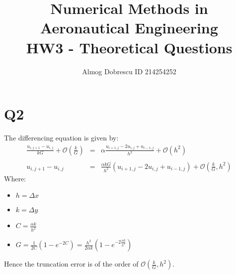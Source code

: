 \documentclass[11pt, a4paper]{article}
\title{Numerical Methods in Aeronautical Engineering \\ HW3 - Theoretical Questions}
\author{Almog Dobrescu ID 214254252}
\begin{document}
\maketitle
\thispagestyle{empty}
\newpage


\tableofcontents
\newpage

\pagestyle{fancy}
\setcounter{page}{1}

\section{Q2}
The differencing equation is given by:
\begin{equation}
    \begin{array}{rcl}
        \displaystyle \frac{u_{i,j+1}-u_{i,j}}{kG}+\mathcal{O}\left(\frac{k}{G}\right) & = & \displaystyle \alpha\frac{u_{i+1,j}-2u_{i,j}+u_{i-1,j}}{h^2}+\mathcal{O}\left(h^2\right) \\\\
        u_{i,j+1}-u_{i,j} & = & \displaystyle \frac{\alpha kG}{h^2}\left(u_{i+1,j}-2u_{i,j}+u_{i-1,j}\right)+\mathcal{O}\left(\frac{k}{G},h^2\right)
    \end{array}
\end{equation}
Where:
\begin{itemize}
    \item $h=\Delta x$
    \item $k=\Delta y$
    \item $C=\displaystyle\frac{\alpha k}{h^2}$
    \item $G=\displaystyle\frac{1}{2C}\left(1-e^{-2C}\right)=\displaystyle\frac{h^2}{2\alpha k}\left(1-e^{-2\frac{\alpha k}{h^2}}\right)$
\end{itemize}
Hence the truncation error is of the order of $\mathcal{O}\left(\frac{k}{G},h^2\right)$. \\
\end{document}

